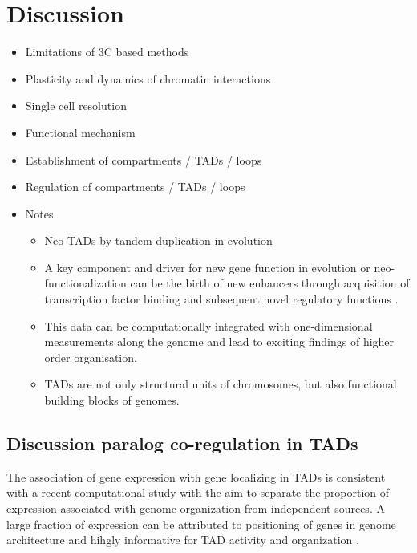 \documentclass[a4paper,twoside=true,openright,parskip=full,chapterprefix=true,11pt,headings=normal,bibliography=totoc,listof=totoc,titlepage=on,captions=tableabove,draft=false]{scrreprt}
\providecommand{\tightlist}{%
  \setlength{\itemsep}{0pt}\setlength{\parskip}{0pt}}
\theoremstyle{definition}
\theoremstyle{definition}
\theoremstyle{definition}
\theoremstyle{remark}
\begin{document}
\hypertarget{thesis-discussion}{%
\chapter{Discussion}\label{thesis-discussion}}

\begin{itemize}
\item
  Limitations of 3C based methods
\item
  Plasticity and dynamics of chromatin interactions
\item
  Single cell resolution
\item
  Functional mechanism
\item
  Establishment of compartments / TADs / loops
\item
  Regulation of compartments / TADs / loops
\item
  Notes

  \begin{itemize}
  \tightlist
  \item
    Neo-TADs by tandem-duplication in evolution \citep{Franke2016}
  \item
    A key component and driver for new gene function in evolution or
    neo-functionalization can be the birth of new enhancers through
    acquisition of transcription factor binding and subsequent novel
    regulatory functions \citep{Long2016}.
  \item
    This data can be computationally integrated with one-dimensional
    measurements along the genome and lead to exciting findings of
    higher order organisation.
  \item
    TADs are not only structural units of chromosomes, but also
    functional building blocks of genomes.
  \end{itemize}
\end{itemize}

\hypertarget{discussion-paralog-co-regulation-in-tads}{%
\section{Discussion paralog co-regulation in
TADs}\label{discussion-paralog-co-regulation-in-tads}}

The association of gene expression with gene localizing in TADs is
consistent with a recent computational study with the aim to separate
the proportion of expression associated with genome organization from
independent sources. A large fraction of expression can be attributed to
positioning of genes in genome architecture and hihgly informative for
TAD activity and organization \citep{Rennie2018}.
\end{document}
